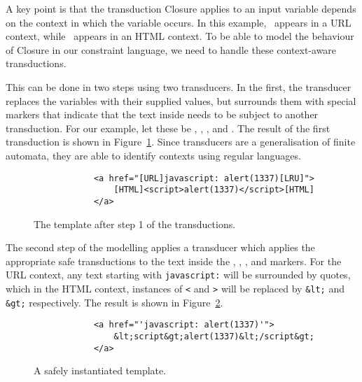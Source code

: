 A key point is that the transduction Closure applies to an input variable depends on the context in which the variable occurs.
In this example, \linkvar\ appears in a URL context, while \linktextvar\ appears in an HTML context.
To be able to model the behaviour of Closure in our constraint language, we need to handle these context-aware transductions.

This can be done in two steps using two transducers.
In the first, the transducer replaces the variables with their supplied values, but surrounds them with special markers that indicate that the text inside needs to be subject to another transduction.
For our example, let these be \urlstarttag, \urlendtag, \htmlstarttag, and \htmlendtag.
The result of the first transduction is shown in Figure~\ref{fig:closure-step-one}.
Since transducers are a generalisation of finite automata, they are able to identify contexts using regular languages.

\begin{figure}
    \begin{verbatim}
            <a href="[URL]javascript: alert(1337)[LRU]">
                [HTML]<script>alert(1337)</script>[HTML]
            </a>
    \end{verbatim}
    \caption{\label{fig:closure-step-one}The template after step 1 of the transductions.}
\end{figure}

The second step of the modelling applies a transducer which applies the appropriate safe transductions to the text inside the \urlstarttag, \urlendtag, \htmlstarttag, and \htmlendtag markers.
For the URL context, any text starting with \texttt{javascript:} will be surrounded by quotes, which in the HTML context, instances of \texttt{<} and \texttt{>} will be replaced by \texttt{\&lt;} and \texttt{\&gt;} respectively.
The result is shown in Figure~\ref{fig:closure-safe}.


\begin{figure}
    \begin{verbatim}
            <a href="'javascript: alert(1337)'">
                &lt;script&gt;alert(1337)&lt;/script&gt;
            </a>
    \end{verbatim}
    \caption{\label{fig:closure-safe}A safely instantiated template.}
\end{figure}



